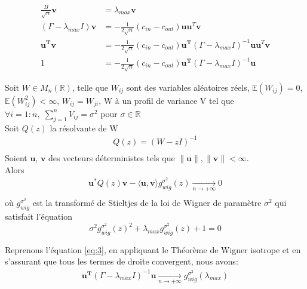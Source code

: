 \begin{align} 
\frac{B}{\sqrt{n}}\mathbf{v} &= \lambda_{max}\mathbf{v} \nonumber\\
(\Gamma - \lambda_{max}I)\mathbf{v} &= -\frac{1}{2\sqrt{n}}(c_{in} - c_{out})\mathbf{uu}^T \mathbf{v} \nonumber\\
 \mathbf{u^Tv} &= -\frac{1}{2\sqrt{n}}(c_{in} - c_{out})\mathbf{u^T}(\Gamma - \lambda_{max}I)^{-1}\mathbf{uu}^T \mathbf{v} \nonumber\\
 1 &= -\frac{1}{2\sqrt{n}}(c_{in} - c_{out})\mathbf{u^T}(\Gamma - \lambda_{max}I)^{-1}\mathbf{u} \label{eq:3}
\end{align}

\begin{theorem}\label{th:2}

Soit $W \in M_{n}(\mathbb{R})$, telle que $W_{ij}$ sont des variables aléatoires réels, $\mathbb{E}(W_{ij}) = 0$, $\mathbb{E}(W_{ij}^2) < \infty$, $W_{ij} = W_{ji}$, W à un profil de variance V tel que $\forall i = 1:n , \; \sum_{j=1}^{n}V_{ij} = \sigma^2$ pour $\sigma \in \mathbb{R}$\\
Soit $Q(z)$ la résolvante de W
\begin{align*} 
Q(z) = (W - zI)^{-1}\\
\end{align*}
Soient $\mathbf{u}$, $\mathbf{v}$ des vecteurs déterministes tels que $\|\mathbf{u}\|, \|\mathbf{v}\| < \infty$.\\
Alors 
\begin{align*} 
\mathbf{u}^*Q(z)\mathbf{v} - \langle \mathbf{u}, \mathbf{v} \rangle g_{wig}^{\sigma^2}(z) \xrightarrow[n \to +\infty]{} 0\\
\end{align*}
où $g_{wig}^{\sigma^2}$ est la transformé de Stieltjes de la loi de Wigner de paramètre $\sigma^2$ qui satisfait l'équation
\begin{equation}
	\sigma^2g_{wig}^{\sigma^2}(z)^2+\lambda_{max}g_{wig}^{\sigma^2}(z)+1=0
\end{equation}
\end{theorem}
Reprenons l’équation \eqref{eq:3}, en appliquant le Théorème de Wigner isotrope et en s'assurant que tous les termes de droite convergent, nous avons:
\begin{align*}
\mathbf{u^T}(\Gamma - \lambda_{max}I)^{-1}\mathbf{u} \xrightarrow[n \to +\infty]{} g_{wig}^{\sigma^2}(\lambda_{max})
\end{align*}
